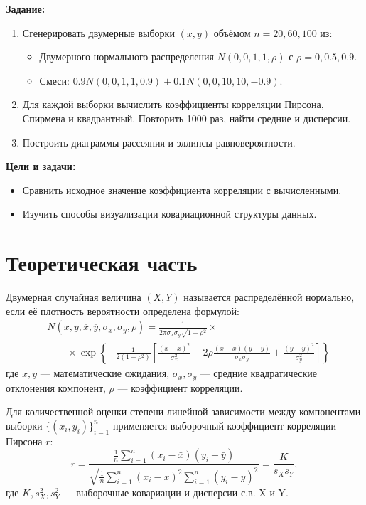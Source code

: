 \documentclass[a4paper, 14pt]{extarticle}
\begin{document}
\textbf{Задание:}
\begin{enumerate}
    \item Сгенерировать двумерные выборки $(x, y)$ объёмом $n = 20, 60, 100$ из:
    \begin{itemize}
        \item Двумерного нормального распределения $N(0,0,1,1,\rho)$ с $\rho = 0,0.5,0.9$.
        \item Смеси: $0.9N(0,0,1,1,0.9) + 0.1N(0,0,10,10,-0.9)$.
    \end{itemize}
    \item Для каждой выборки вычислить коэффициенты корреляции Пирсона, Спирмена и квадрантный. Повторить 1000 раз, найти средние и дисперсии.
    \item Построить диаграммы рассеяния и эллипсы равновероятности.
\end{enumerate}

\textbf{Цели и задачи:}
\begin{itemize}
    \item Сравнить исходное значение коэффициента корреляции с вычисленными.
    \item Изучить способы визуализации ковариационной структуры данных.
\end{itemize}

\section{Теоретическая часть}

Двумерная случайная величина $(X,Y)$ называется распределённой нормально, если её плотность вероятности определена формулой:
\begin{equation*}
\begin{split}
&N(x, y, \overline{x}, \overline{y}, \sigma_x, \sigma_y, \rho) = \frac{1}{2\pi\sigma_x\sigma_y\sqrt{1-\rho^2}} \times \\
&\qquad \times \exp \left\{ -\frac{1}{2(1-\rho^2)} \left[ \frac{(x-\overline{x})^2}{\sigma_x^2} - 2\rho\frac{(x-\overline{x})(y-\overline{y})}{\sigma_x\sigma_y} + \frac{(y-\overline{y})^2}{\sigma_y^2} \right] \right\}
\end{split}
\end{equation*}
где $\overline{x},\overline{y}$ --- математические ожидания, $\sigma_x, \sigma_y$ — средние квадратические отклонения компонент, $\rho$ — коэффициент корреляции.

Для количественной оценки степени линейной зависимости между компонентами выборки $\{(x_i, y_i)\}_{i=1}^n$ применяется выборочный коэффициент корреляции Пирсона $r$:
\begin{equation*}
    r = \frac{\frac{1}{n}\sum_{i=1}^n (x_i - \bar{x})(y_i - \bar{y})}{\sqrt{\frac{1}{n}\sum_{i=1}^n (x_i - \bar{x})^2 \sum_{i=1}^n (y_i - \bar{y})^2}} = \frac{K}{s_X s_Y},
\end{equation*}
где $K,s^2_X,s^2_Y$ --- выборочные ковариации и дисперсии с.в. X и Y.
\end{document}
